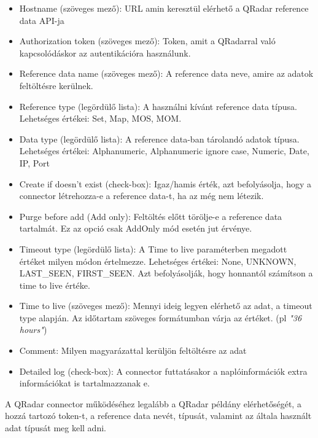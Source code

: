 \begin{itemize}
	\item Hostname (szöveges mező): URL amin keresztül elérhető a QRadar reference data API-ja 
	
	\item Authorization token (szöveges mező): Token, amit a QRadarral való kapcsolódáskor az autentikációra használunk.
	
	\item Reference data name (szöveges mező): A reference data neve, amire az adatok feltöltésre kerülnek.
	
	\item Reference type (legördülő lista): A használni kívánt reference data típusa. Lehetséges értékei: Set, Map, MOS, MOM.
	
	\item Data type (legördülő lista): A reference data-ban tárolandó adatok típusa. Lehetséges értékei: Alphanumeric, Alphanumeric ignore case, Numeric, Date, IP, Port
	
	\item Create if doesn't exist (check-box): Igaz/hamis érték, azt befolyásolja, hogy a connector létrehozza-e a reference data-t, ha az még nem létezik.
	
	\item Purge before add (Add only): Feltöltés előtt törölje-e a reference data tartalmát. Ez az opció csak AddOnly mód esetén jut érvénye.
	
	\item Timeout type (legördülő lista): A Time to live paraméterben megadott értéket milyen módon értelmezze. Lehetséges értékei: None, UNKNOWN, LAST\_SEEN, FIRST\_SEEN. Azt befolyásolják, hogy honnantól 
	számítson a time to live értéke.
	
	\item Time to live (szöveges mező): Mennyi ideig legyen elérhető az adat, a timeout type alapján. Az időtartam szöveges formátumban várja az értéket. (pl \textit{"36 hours"})
	
	\item Comment: Milyen magyarázattal kerüljön feltöltésre az adat
	
	\item Detailed log (check-box): A connector futtatásakor a naplóinformációk extra információkat is tartalmazzanak e.
	
\end{itemize} 
A QRadar connector működéséhez legalább a QRadar példány elérhetőségét, a hozzá tartozó token-t, a reference data nevét, típusát, valamint az általa használt adat típusát meg kell adni.

